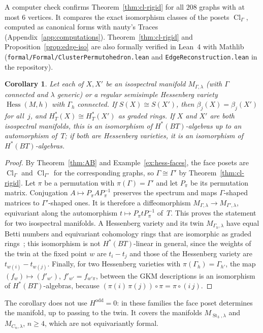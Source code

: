 \documentclass[11pt,a4paper]{article}
\numberwithin{equation}{section}
\theoremstyle{plain}
\newtheorem{corollary}[theorem]{Corollary}
\theoremstyle{definition}
\theoremstyle{remark}
\newcommand{\HT}{H^{*}_{T}}
\DeclareMathOperator{\Hess}{Hess}
\DeclareMathOperator{\Cl}{Cl}
\DeclareMathOperator{\St}{St}
\begin{document}
A computer check confirms Theorem~\ref{thm:cl-rigid} for all $208$ graphs with at most $6$ vertices. It compares the exact isomorphism classes of the posets $\Cl_\Gamma$, computed as canonical forms with nauty's Traces (Appendix~\ref{app:computations}). Theorem~\ref{thm:cl-rigid} and Proposition~\ref{prop:edge-iso} are also formally verified in Lean~4 with Mathlib (\nolinkurl{formal/Formal/ClusterPermutohedron.lean} and \nolinkurl{EdgeReconstruction.lean} in the repository).

\begin{corollary}\label{cor:q1-hess}
Let each of $X,X'$ be an isospectral manifold $M_{\Gamma,\lambda}$ (with $\Gamma$ connected and $\lambda$ generic) or a regular semisimple Hessenberg variety $\Hess(M,h)$ with $\Gamma_h$ connected. If $S(X)\cong S(X')$, then $\beta_j(X)=\beta_j(X')$ for all~$j$, and $\HT(X)\cong\HT(X')$ as graded rings. If $X$ and $X'$ are both isospectral manifolds, this is an isomorphism of $H^*(BT)$-algebras up to an automorphism of~$T$; if both are Hessenberg varieties, it is an isomorphism of $H^*(BT)$-algebras.
\end{corollary}

\begin{proof}
By Theorem~\ref{thm:AB} and Example~\ref{ex:hess-faces}, the face posets are $\Cl_\Gamma$ and $\Cl_{\Gamma'}$ for the corresponding graphs, so $\Gamma\cong\Gamma'$ by Theorem~\ref{thm:cl-rigid}. Let $\pi$ be a permutation with $\pi(\Gamma)=\Gamma'$ and let $P_\pi$ be its permutation matrix. Conjugation $A\mapsto P_\pi AP_\pi^{-1}$ preserves the spectrum and maps $\Gamma$-shaped matrices to $\Gamma'$-shaped ones. It is therefore a diffeomorphism $M_{\Gamma,\lambda}\to M_{\Gamma',\lambda}$, equivariant along the automorphism $t\mapsto P_\pi tP_\pi^{-1}$ of~$T$. This proves the statement for two isospectral manifolds. A Hessenberg variety and its twin $M_{\Gamma_h,\lambda}$ have equal Betti numbers and equivariant cohomology rings that are isomorphic as graded rings~\cite[Thm.~3.11]{AB21}; this isomorphism is not $H^*(BT)$-linear in general, since the weights of the twin at the fixed point $w$ are $t_i-t_j$ and those of the Hessenberg variety are $t_{w(i)}-t_{w(j)}$. Finally, for two Hessenberg varieties with $\pi(\Gamma_h)=\Gamma_{h'}$, the map $(f_w)\mapsto(f'_{w'})$, $f'_{w'}=f_{w'\pi}$, between the GKM descriptions is an isomorphism of $H^*(BT)$-algebras, because $(\pi(i)\,\pi(j))\circ\pi=\pi\circ(i\,j)$.
\end{proof}

The corollary does not use $H^{\mathrm{odd}}=0$: in these families the face poset determines the manifold, up to passing to the twin. It covers the manifolds $M_{\St_3,\lambda}$ and $M_{C_n,\lambda}$, $n\geqslant4$, which are not equivariantly formal.
\end{document}
